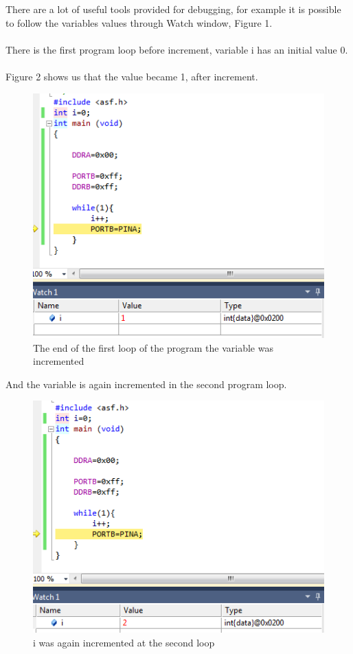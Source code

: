 \documentclass[english]{article}
\begin{document}
There are a lot of useful tools provided for debugging, for example it is possible to follow the variables values through Watch window, Figure 1.\\\\
There is the first program loop before increment, variable i has an initial value 0.\\\\
Figure 2 shows us that the value became 1, after increment.
\begin{figure}[H]
\centerline{\includegraphics[scale=0.8]{MicroLab3/i_1}}
\caption{The end of the first loop of the program the variable was incremented}
\end{figure}
And the variable is again incremented in the second program loop.
\begin{figure}[H]
\centerline{\includegraphics[scale=0.8]{MicroLab3/i_2}}
\caption{i was again incremented at the second loop}
\end{figure}
\end{document}

